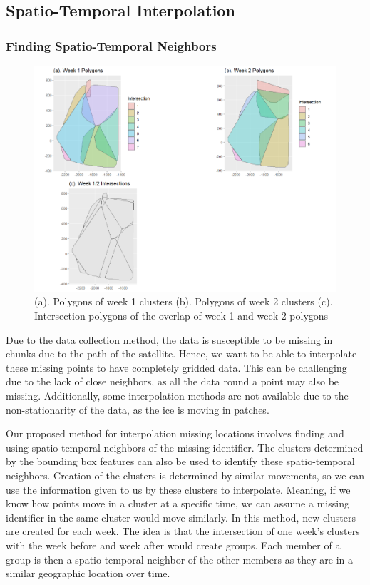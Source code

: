 \documentclass[12pt]{article}
\begin{document}
\hypertarget{spatio-temporal-interpolation}{%
\subsection{Spatio-Temporal
Interpolation}\label{spatio-temporal-interpolation}}

\hypertarget{finding-spatio-temporal-neighbors}{%
\subsubsection{Finding Spatio-Temporal
Neighbors}\label{finding-spatio-temporal-neighbors}}

\begin{figure}[tbp]

{\centering \includegraphics[width=0.7\linewidth,]{images/int-one} 

}

\caption{(a). Polygons of week 1 clusters (b). Polygons of week 2 clusters (c). Intersection polygons of the overlap of week 1 and week 2 polygons}\label{fig:int-plot}
\end{figure}

Due to the data collection method, the data is susceptible to be missing
in chunks due to the path of the satellite. Hence, we want to be able to
interpolate these missing points to have completely gridded data. This
can be challenging due to the lack of close neighbors, as all the data
round a point may also be missing. Additionally, some interpolation
methods are not available due to the non-stationarity of the data, as
the ice is moving in patches.

Our proposed method for interpolation missing locations involves finding
and using spatio-temporal neighbors of the missing identifier. The
clusters determined by the bounding box features can also be used to
identify these spatio-temporal neighbors. Creation of the clusters is
determined by similar movements, so we can use the information given to
us by these clusters to interpolate. Meaning, if we know how points move
in a cluster at a specific time, we can assume a missing identifier in
the same cluster would move similarly. In this method, new clusters are
created for each week. The idea is that the intersection of one week's
clusters with the week before and week after would create groups. Each
member of a group is then a spatio-temporal neighbor of the other
members as they are in a similar geographic location over time.
\end{document}

